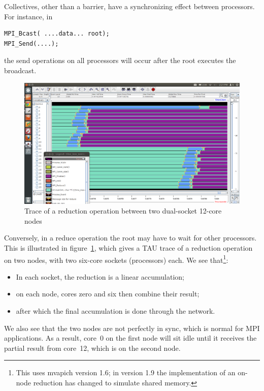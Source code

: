 Collectives, other than a barrier, have a synchronizing effect between processors.
For instance, in
\begin{verbatim}
MPI_Bcast( ....data... root);
MPI_Send(....);
\end{verbatim}
the send operations on all processors will occur after the root executes
the broadcast. 
\begin{figure}[ht]
  \includegraphics[scale=.35]{graphics/reduce-two-node}
  \caption{Trace of a reduction operation between two dual-socket 12-core nodes}
  \label{fig:trace-reduce}
\end{figure}
Conversely, in a reduce operation the root may have to wait for 
other processors. This is illustrated in figure~\ref{fig:trace-reduce}, which 
gives a TAU trace of
a reduction operation on two nodes, with two six-core sockets (processors) each.
We see that\footnote
{This uses mvapich version 1.6; in version 1.9 the implementation of an on-node reduction
has changed to simulate shared memory.}:
\begin{itemize}
\item In each socket, the reduction is a linear accumulation;
\item on each node, cores zero and six then combine their result;
\item after which the final accumulation is done through the network.
\end{itemize}
We also see that the two nodes are not perfectly in sync, which is normal for MPI
applications. As a result, core~0 on the first node will sit idle until it receives the partial
result from core~12, which is on the second node.

